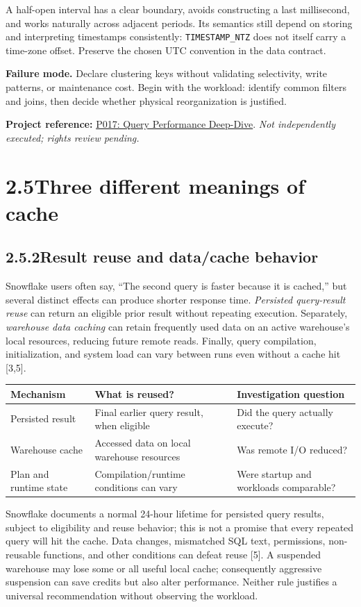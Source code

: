 \documentclass[11pt,twoside]{article}
\newcommand{\topic}[2]{\subsection*{#1\quad #2}}
\newcommand{\repo}[2]{\par\begingroup\fontsize{8.0}{9.6}\selectfont\sffamily\color{inkgray}\textbf{Project reference:} \href{#2}{#1}. \textit{Not independently executed; rights review pending.}\par\endgroup}
\begin{document}
A half-open interval has a clear boundary, avoids constructing a last millisecond, and works naturally across adjacent periods. Its semantics still depend on storing and interpreting timestamps consistently: \texttt{TIMESTAMP\_NTZ} does not itself carry a time-zone offset. Preserve the chosen UTC convention in the data contract.

\textbf{Failure mode.} Declare clustering keys without validating selectivity, write patterns, or maintenance cost. Begin with the workload: identify common filters and joins, then decide whether physical reorganization is justified.
\repo{P017: Query Performance Deep-Dive}{https://github.com/sfc-gh-bokon/query_performance_deep_dive}

\newpage
\section*{2.5\quad Three different meanings of cache}
\topic{2.5.2}{Result reuse and data/cache behavior}
Snowflake users often say, ``The second query is faster because it is cached,'' but several distinct effects can produce shorter response time. \emph{Persisted query-result reuse} can return an eligible prior result without repeating execution. Separately, \emph{warehouse data caching} can retain frequently used data on an active warehouse's local resources, reducing future remote reads. Finally, query compilation, initialization, and system load can vary between runs even without a cache hit [3,5].

\begin{center}\small
\begin{tabularx}{\linewidth}{@{}p{30mm}X X@{}}\toprule
\textbf{Mechanism} & \textbf{What is reused?} & \textbf{Investigation question}\\\midrule
Persisted result & Final earlier query result, when eligible & Did the query actually execute?\\
Warehouse cache & Accessed data on local warehouse resources & Was remote I/O reduced?\\
Plan and runtime state & Compilation/runtime conditions can vary & Were startup and workloads comparable?\\
\bottomrule\end{tabularx}\end{center}

Snowflake documents a normal 24-hour lifetime for persisted query results, subject to eligibility and reuse behavior; this is not a promise that every repeated query will hit the cache. Data changes, mismatched SQL text, permissions, non-reusable functions, and other conditions can defeat reuse [5]. A suspended warehouse may lose some or all useful local cache; consequently aggressive suspension can save credits but also alter performance. Neither rule justifies a universal recommendation without observing the workload.
\end{document}
